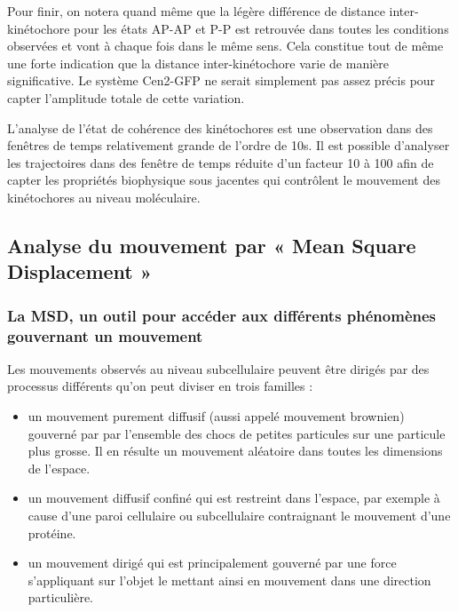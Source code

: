 \documentclass[12pt,a4paper,twoside,openright]{book}
\begin{document}
Pour finir, on notera quand même que la légère différence de distance
inter-kinétochore pour les états AP-AP et P-P est retrouvée dans toutes
les conditions observées et vont à chaque fois dans le même sens. Cela
constitue tout de même une forte indication que la distance
inter-kinétochore varie de manière significative. Le système Cen2-GFP ne
serait simplement pas assez précis pour capter l'amplitude totale de
cette variation.

L'analyse de l'état de cohérence des kinétochores est une observation
dans des fenêtres de temps relativement grande de l'ordre de 10s. Il est
possible d'analyser les trajectoires dans des fenêtre de temps réduite
d'un facteur 10 à 100 afin de capter les propriétés biophysique sous
jacentes qui contrôlent le mouvement des kinétochores au niveau
moléculaire.

\subsection{Analyse du mouvement par « Mean Square Displacement
»}\label{analyse-du-mouvement-par-mean-square-displacement}

\subsubsection{La MSD, un outil pour accéder aux différents phénomènes
gouvernant un
mouvement}\label{la-msd-un-outil-pour-accuxe9der-aux-diffuxe9rents-phuxe9nomuxe8nes-gouvernant-un-mouvement}

Les mouvements observés au niveau subcellulaire peuvent être dirigés par
des processus différents qu'on peut diviser en trois familles :

\begin{itemize}
\item
  un mouvement purement diffusif (aussi appelé mouvement brownien)
  gouverné par par l'ensemble des chocs de petites particules sur une
  particule plus grosse. Il en résulte un mouvement aléatoire dans
  toutes les dimensions de l'espace.
\item
  un mouvement diffusif confiné qui est restreint dans l'espace, par
  exemple à cause d'une paroi cellulaire ou subcellulaire contraignant
  le mouvement d'une protéine.
\item
  un mouvement dirigé qui est principalement gouverné par une force
  s'appliquant sur l'objet le mettant ainsi en mouvement dans une
  direction particulière.
\end{itemize}
\end{document}
